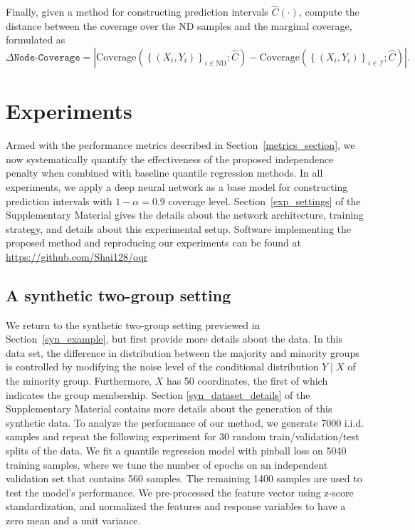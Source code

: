 \documentclass{article}
\begin{document}
Finally, given a method for constructing prediction intervals $\hat{C}(\cdot)$, compute the distance between the coverage over the ND samples and the marginal coverage, formulated as $$ \Delta\texttt{Node-Coverage}= \left| \textrm{Coverage}\left(\left\{(X_i,Y_i)\right\}_{i \in \textrm{ND}}; \hat{C}\right) - \textrm{Coverage}\left(\left\{(X_i,Y_i)\right\}
_{i \in \mathcal{I}}; \hat{C}\right) \right|.$$ 



\section{Experiments}\label{sec:experiments}
Armed with the performance metrics described in Section~\ref{metrics_section}, we now systematically quantify the effectiveness of the proposed independence penalty when combined with baseline quantile regression methods. In all experiments, we apply a deep neural network as a base model for constructing prediction intervals with $1-\alpha = 0.9$ coverage level. Section~\ref{exp_settings} of the Supplementary Material gives the details about the network architecture, training strategy, and details about this experimental setup. Software implementing the proposed method and reproducing our experiments can be found at \url{https://github.com/Shai128/oqr}


\subsection{A synthetic two-group setting}\label{syn_data_section}
We return to the synthetic two-group setting previewed in Section~\ref{syn_example}, but first provide more details about the data. In this data set, the difference in distribution between the majority and minority groups is controlled by modifying the noise level of the conditional distribution $Y \mid X$ of the minority group. Furthermore, $X$ has 50 coordinates, the first of which indicates the group membership. Section \ref{syn_dataset_details} of the Supplementary Material contains more details about the generation of this synthetic data. To analyze the performance of our method, we generate 7000 i.i.d. samples and repeat the following experiment for 30 random train/validation/test splits of the data. We fit a quantile regression model with pinball loss on 5040 training samples, where we tune the number of epochs on an independent validation set that contains 560 samples. The remaining 1400 samples are used to test the model's performance. We pre-processed the feature vector using z-score standardization, and normalized the features and response variables to have a zero mean and a unit variance.
\end{document}
